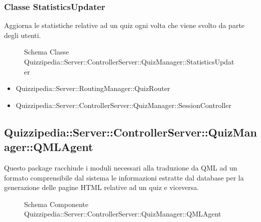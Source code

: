 \subsubsection{Classe StatisticsUpdater}
Aggiorna le statistiche relative ad un quiz ogni volta che viene svolto da parte degli utenti.
\begin{figure}[H]
\centering
\noindent{}
\caption{Schema Classe Quizzipedia::Server::ControllerServer::QuizManager::StatisticsUpdater}
\end{figure}
\begin{itemize}
\item Quizzipedia::Server::RoutingManager::QuizRouter
\end{itemize}
\begin{itemize}
\item Quizzipedia::Server::ControllerServer::QuizManager::SessionController
\end{itemize}
\subsection{Quizzipedia::Server::ControllerServer::QuizManager::QMLAgent}
Questo package racchiude i moduli necessari alla traduzione da QML ad un formato comprensibile dal sistema le informazioni estratte dal database per la generazione delle pagine HTML relative ad un quiz e viceversa.
\begin{figure}[H]
\centering
\noindent{}
\caption[Quizzipedia::Server::ControllerServer::QuizManager::QMLAgent]{Schema Componente Quizzipedia::Server::ControllerServer::QuizManager::QMLAgent}
\end{figure}
